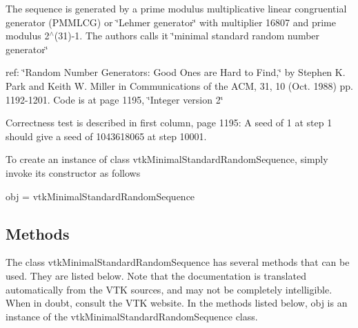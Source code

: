 The sequence is generated by a prime modulus multiplicative linear congruential generator (P\-M\-M\-L\-C\-G) or \char`\"{}\-Lehmer generator\char`\"{} with multiplier 16807 and prime modulus 2$^\wedge$(31)-\/1. The authors calls it \char`\"{}minimal standard random number generator\char`\"{}

ref\-: \char`\"{}\-Random Number Generators\-: Good Ones are Hard to Find,\char`\"{} by Stephen K. Park and Keith W. Miller in Communications of the A\-C\-M, 31, 10 (Oct. 1988) pp. 1192-\/1201. Code is at page 1195, \char`\"{}\-Integer version 2\char`\"{}

Correctness test is described in first column, page 1195\-: A seed of 1 at step 1 should give a seed of 1043618065 at step 10001.

To create an instance of class vtk\-Minimal\-Standard\-Random\-Sequence, simply invoke its constructor as follows \begin{DoxyVerb}  obj = vtkMinimalStandardRandomSequence
\end{DoxyVerb}
 \hypertarget{vtkwidgets_vtkxyplotwidget_Methods}{}\subsection{Methods}\label{vtkwidgets_vtkxyplotwidget_Methods}
The class vtk\-Minimal\-Standard\-Random\-Sequence has several methods that can be used. They are listed below. Note that the documentation is translated automatically from the V\-T\-K sources, and may not be completely intelligible. When in doubt, consult the V\-T\-K website. In the methods listed below, {\ttfamily obj} is an instance of the vtk\-Minimal\-Standard\-Random\-Sequence class. 
